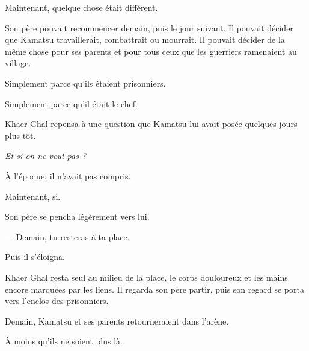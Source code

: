 Maintenant, quelque chose était différent.

Son père pouvait recommencer demain, puis le jour suivant. Il pouvait décider
que Kamatsu travaillerait, combattrait ou mourrait. Il pouvait décider de la
même chose pour ses parents et pour tous ceux que les guerriers ramenaient au
village.

Simplement parce qu'ils étaient prisonniers.

Simplement parce qu'il était le chef.

Khaer Ghal repensa à une question que Kamatsu lui avait posée quelques jours
plus tôt.

\emph{Et si on ne veut pas ?}

À l'époque, il n'avait pas compris.

Maintenant, si.

Son père se pencha légèrement vers lui.

— Demain, tu resteras à ta place.

Puis il s'éloigna.

Khaer Ghal resta seul au milieu de la place, le corps douloureux et les mains
encore marquées par les liens. Il regarda son père partir, puis son regard se
porta vers l'enclos des prisonniers.

Demain, Kamatsu et ses parents retourneraient dans l'arène.

À moins qu'ils ne soient plus là.